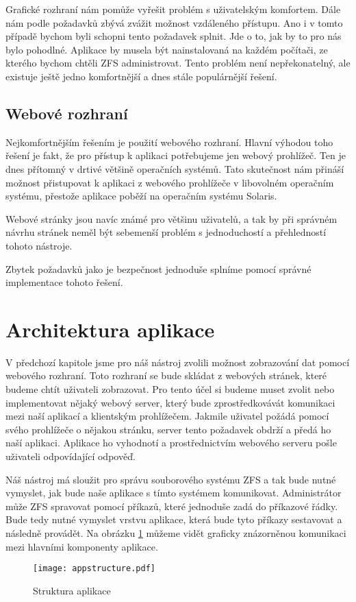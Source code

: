     Grafické rozhraní nám pomůže vyřešit problém s uživatelským komfortem. Dále nám podle požadavků zbývá zvážit možnost vzdáleného přístupu. Ano i v tomto případě bychom byli schopni tento požadavek splnit. Jde o to, jak by to pro nás bylo pohodlné. Aplikace by musela být nainstalovaná na každém počítači, ze kterého bychom chtěli ZFS administrovat. Tento problém není nepřekonatelný, ale existuje ještě jedno komfortnější a dnes stále populárnější řešení.
    \subsection{Webové rozhraní}
    Nejkomfortnějším řešením je použití webového rozhraní. Hlavní výhodou toho řešení je fakt, že pro přístup k aplikaci potřebujeme jen webový prohlížeč. Ten je dnes přítomný v drtivé většině operačních systémů. Tato skutečnost nám přináší možnost přistupovat k aplikaci z webového prohlížeče v libovolném operačním systému, přestože aplikace poběží na operačním systému Solaris.

    Webové stránky jsou navíc známé pro většinu uživatelů, a tak by při správném návrhu stránek neměl být sebemenší problém s jednoduchostí a přehledností tohoto nástroje.

    Zbytek požadavků jako je bezpečnost jednoduše splníme pomocí správné implementace tohoto řešení.
\section{Architektura aplikace}
V předchozí kapitole jsme pro náš nástroj zvolili možnost zobrazování dat pomocí webového rozhraní. Toto rozhraní se bude skládat z webových stránek, které budeme chtít uživateli zobrazovat. Pro tento účel si budeme muset zvolit nebo implementovat nějaký webový server, který bude zprostředkovávát komunikaci mezi naší aplikací a klientským prohlížečem. Jakmile uživatel požádá pomocí svého prohlížeče o nějakou stránku, server tento požadavek obdrží a předá ho naší aplikaci. Aplikace ho vyhodnotí a prostřednictvím webového serveru pošle uživateli odpovídající odpověď.

Náš nástroj má sloužit pro správu souborového systému ZFS a tak bude nutné vymyslet, jak bude naše aplikace s tímto systémem komunikovat. Administrátor může ZFS spravovat pomocí příkazů, které jednoduše zadá do příkazové řádky. Bude tedy nutné vymyslet vrstvu aplikace, která bude tyto příkazy sestavovat a následně provádět. Na obrázku \ref{architecture} můžeme vidět graficky znázorněnou komunikaci mezi hlavními komponenty aplikace.
\begin{figure}[h]
        \centering
        \texttt{[image: appstructure.pdf]}
        \caption{Struktura aplikace}
        \label{architecture}
\end{figure}
